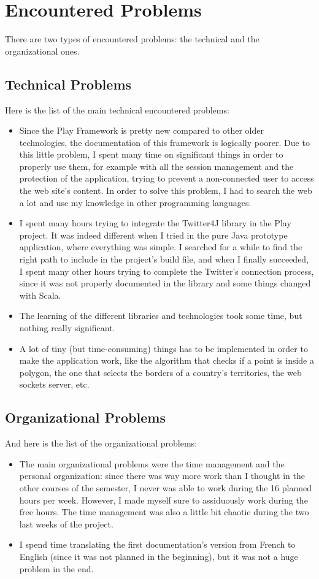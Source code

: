\documentclass[a4paper,11pt]{report}
\begin{document}
\section{Encountered Problems}
There are two types of encountered problems: the technical and the organizational ones.
\subsection{Technical Problems}
Here is the list of the main technical encountered problems:
\begin{itemize}
	\item Since the Play Framework is pretty new compared to other older technologies, the documentation of this framework is logically poorer. Due to this little problem, I spent many time on significant things in order to properly use them, for example with all the session management and the protection of the application, trying to prevent a non-connected user to access the web site's content.
	In order to solve this problem, I had to search the web a lot and use my knowledge in other programming languages.
	\item I spent many hours trying to integrate the Twitter4J library in the Play project. It was indeed different when I tried in the pure Java prototype application, where everything was simple. I searched for a while to find the right path to include in the project's build file, and when I finally succeeded, I spent many other hours trying to complete the Twitter's connection process, since it was not properly documented in the library and some things changed with Scala.
	\item The learning of the different libraries and technologies took some time, but nothing really significant.
	\item A lot of tiny (but time-consuming) things has to be implemented in order to make the application work, like the algorithm that checks if a point is inside a polygon, the one that selects the borders of a country's territories, the web sockets server, etc.
\end{itemize}
\bigskip

\subsection{Organizational Problems}
And here is the list of the organizational problems:
\begin{itemize}
	\item The main organizational problems were the time management and the personal organization: since there was way more work than I thought in the other courses of the semester, I never was able to work during the 16 planned hours per week. However, I made myself sure to assiduously work during the free hours. The time management was also a little bit chaotic during the two last weeks of the project.
	\item I spend time translating the first documentation's version from French to English (since it was not planned in the beginning), but it was not a huge problem in the end.
\end{itemize}
\newpage	
\end{document}
